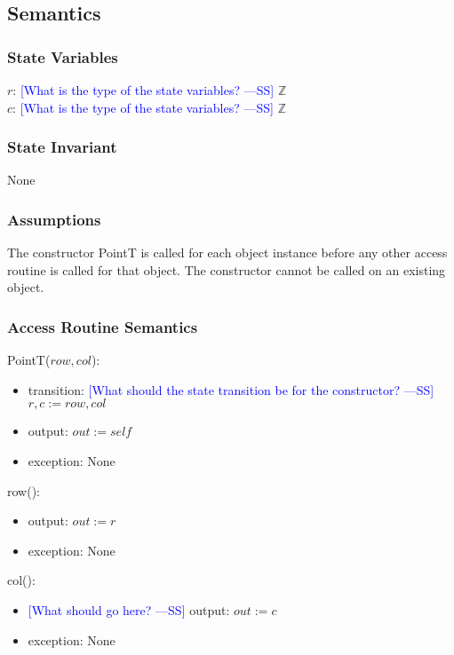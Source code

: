 \documentclass[12pt]{article}
\newcommand{\authornote}[3]{\textcolor{#1}{[#3 ---#2]}}
\newcommand{\authornote}[3]{}
\newcommand{\wss}[1]{\authornote{blue}{SS}{#1}}
\begin{document}
\subsection* {Semantics}

\subsubsection* {State Variables}

$r$: \wss{What is the type of the state variables?} $\mathbb{Z}$\\
$c$: \wss{What is the type of the state variables?} $\mathbb{Z}$

\subsubsection* {State Invariant}

None

\subsubsection* {Assumptions}

The constructor PointT is called for each object instance before any other
access routine is called for that object.  The constructor cannot be called on
an existing object.

\subsubsection* {Access Routine Semantics}

PointT($row, col$):
\begin{itemize}
\item transition: \wss{What should the state transition be for the constructor?}\\$r, c := row, col$
\item output: $out := \mathit{self}$
\item exception: None
\end{itemize}

\noindent row():
\begin{itemize}
\item output: $out := r$
\item exception: None
\end{itemize}

\noindent col():
\begin{itemize}
\item \wss{What should go here?} output: $out := c$
\item exception: None
\end{itemize}
\end{document}
